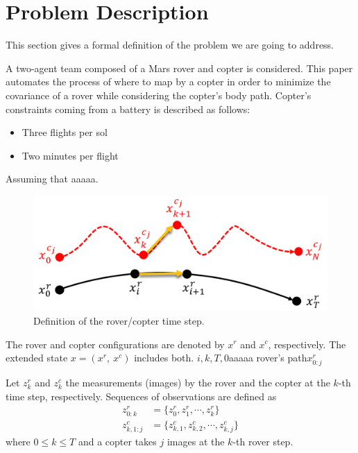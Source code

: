 \documentclass[conference]{IEEEtran}
\begin{document}
\section{Problem Description}
This section gives a formal definition of the problem we are going to address. 

A two-agent team composed of a Mars rover and copter is considered. This paper automates the process of where to map by a copter in order to minimize the covariance of a rover while considering the copter’s body path.
Copter’s constraints coming from a battery is described as follows:
\begin{itemize}
    \item Three flights per sol
    \item Two minutes per flight
\end{itemize}






 Assuming that aaaaa.
 
 \begin{figure}[h]
		\centering
		\includegraphics[width=0.8\columnwidth]{figs/8_3.png}
		\caption{Definition of the rover/copter time step.}
		\label{fig:8_3}
\end{figure}

The rover and copter configurations are denoted by $x^r$ and $x^c$, respectively. The extended state $x=(x^r,~x^c)$ includes both.
$i, k, T, 0$aaaaa rover's path$x^r_{0:j}$

Let $z^r_k$ and $z^c_k$ the measurements (images) by the rover and the copter at the $k$-th time step, respectively. Sequences of observations are defined as
\begin{align}
    z^r_{0:k}&=\{z^r_0,z^r_1,\cdots,z^r_k\}\\
    z^c_{k,1:j}&=\{z^c_{k,1},z^c_{k,2},\cdots,z^c_{k,j}\}
\end{align}
where $0 \leq k \leq T$ and a copter takes $j$ images at the $k$-th rover step.
\end{document}
